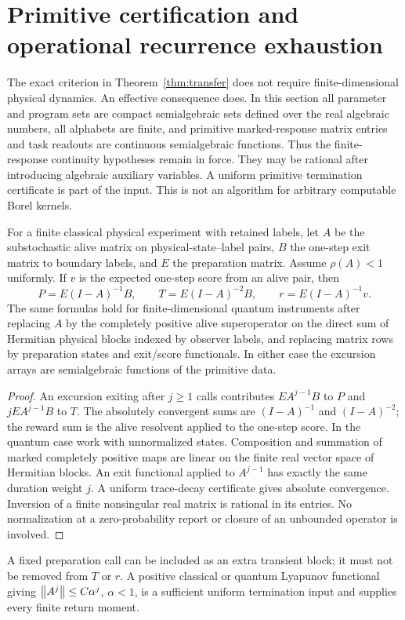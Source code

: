 \section{Primitive certification and operational recurrence exhaustion}\label{sec:algebraic}
The exact criterion in Theorem~\ref{thm:transfer} does not require finite-dimensional physical dynamics. An effective consequence does. In this section all parameter and program sets are compact semialgebraic sets defined over the real algebraic numbers, all alphabets are finite, and primitive marked-response matrix entries and task readouts are continuous semialgebraic functions. Thus the finite-response continuity hypotheses remain in force. They may be rational after introducing algebraic auxiliary variables. A uniform primitive termination certificate is part of the input. This is not an algorithm for arbitrary computable Borel kernels.

\begin{lemma}\label{lem:resolvent}
For a finite classical physical experiment with retained labels, let $A$ be the substochastic alive matrix on physical-state--label pairs, $B$ the one-step exit matrix to boundary labels, and $E$ the preparation matrix. Assume $\rho(A)<1$ uniformly. If $v$ is the expected one-step score from an alive pair, then
\begin{equation}\label{eq:resolvents}
 P=E(I-A)^{-1}B,\qquad
 T=E(I-A)^{-2}B,\qquad
 r=E(I-A)^{-1}v.
\end{equation}
The same formulas hold for finite-dimensional quantum instruments after replacing $A$ by the completely positive alive superoperator on the direct sum of Hermitian physical blocks indexed by observer labels, and replacing matrix rows by preparation states and exit/score functionals. In either case the excursion arrays are semialgebraic functions of the primitive data.
\end{lemma}
\begin{proof}
An excursion exiting after $j\ge1$ calls contributes $EA^{j-1}B$ to $P$ and $jEA^{j-1}B$ to $T$. The absolutely convergent sums are $(I-A)^{-1}$ and $(I-A)^{-2}$; the reward sum is the alive resolvent applied to the one-step score. In the quantum case work with unnormalized states. Composition and summation of marked completely positive maps are linear on the finite real vector space of Hermitian blocks. An exit functional applied to $A^{j-1}$ has exactly the same duration weight $j$. A uniform trace-decay certificate gives absolute convergence. Inversion of a finite nonsingular real matrix is rational in its entries. No normalization at a zero-probability report or closure of an unbounded operator is involved.
\end{proof}
A fixed preparation call can be included as an extra transient block; it must not be removed from $T$ or $r$. A positive classical or quantum Lyapunov functional giving $\left\lVert A^j\right\rVert\le C\alpha^j$, $\alpha<1$, is a sufficient uniform termination input and supplies every finite return moment.

